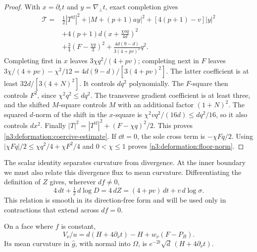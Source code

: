 \begin{proof}
With $x=\partial_e t$ and $y=\nabla_\perp t$, exact completion gives
\begin{equation}\label{n3:deformation:square-completion}
 \begin{split}
 \mathcal T={}&\tfrac12|T^{\operatorname{tf}}|^2
 +|M+(p+1)ay|^2+[4(p+1)-v]|y|^2\\
 &+4(p+1)d\left(x+\frac{\chi aq}{4d}\right)^2\\
 &+\tfrac34\left(F-\frac{\chi q}{3}\right)^2
 +\frac{4d(9-d)}{3(4+pv)^2}q^2.
 \end{split}
\end{equation}
Completing first in $x$ leaves $3\chi q^2/(4+pv)$; completing next in
$F$ leaves $3\chi/(4+pv)-\chi^2/12=4d(9-d)/[3(4+pv)^2]$.
The latter coefficient is at least $32d/[3(4+N)^2]$.
It controls $dq^2$ polynomially. The $F$-square then controls $F^2$,
since $\chi^2q^2\le dq^2$.
The transverse gradient coefficient is at least three, and the shifted
$M$-square controls $M$ with an additional factor $(1+N)^2$.
The squared $d$-norm of the shift in the $x$-square is
$\chi^2vq^2/(16d)\le dq^2/16$, so it also controls $dx^2$.
Finally $|T|^2=|T^{\operatorname{tf}}|^2+(F-\chi q)^2/2$.
This proves \eqref{n3:deformation:coercive-estimate}.
If $\dd t=0$, the sole cross term is $-\chi Fq/2$.
Using $|\chi Fq|/2\le\chi q^2/4+\chi F^2/4$ and $0<\chi\le1$
proves \eqref{n3:deformation:floor-norm}.
\end{proof}

The scalar identity separates curvature from divergence. At the inner
boundary we must also relate this divergence flux to mean curvature.
Differentiating the definition of $Z$ gives, wherever $df\ne0$,
\begin{equation}\label{n3:deformation:Z-differential}
 4\,dt+\tfrac12\,d\log D
       =4\,dZ=(4+pv)\,dt+v\,d\log\sigma.
\end{equation}
This relation is smooth in its direction-free form and will be used
only in contractions that extend across $df=0$.

\begin{lemma}\label{n3:deformation:boundary-identity}
On a face where $f$ is constant,
\begin{equation}\label{n3:deformation:boundary}
 V_\nu/u=d(H+4\partial_\nu t)-H+w_\nu(F-P_B).
\end{equation}
Its mean curvature in $\hat g$, with normal into $\Omega$, is
$e^{-2t}\sqrt d\,(H+4\partial_\nu t)$.
\end{lemma}

